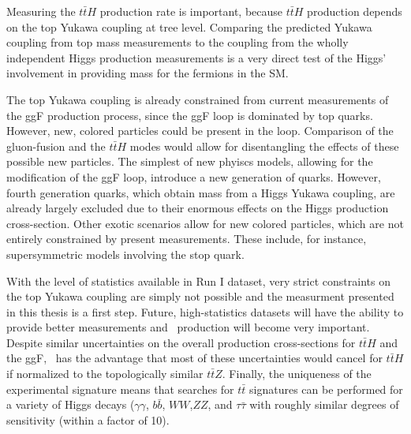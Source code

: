 Measuring the $t\bar{t}H$ production rate is important, because
$t\bar{t}H$ production depends on the top Yukawa coupling at tree level. Comparing
the predicted Yukawa coupling from top mass measurements to the coupling from
the wholly independent Higgs production measurements is a very direct 
test of the Higgs' involvement in providing mass for the fermions in the SM.

The top Yukawa coupling is already constrained from current measurements of the ggF production
process, since the ggF loop is dominated by top quarks. However, new, colored particles could be
present in the loop. Comparison of the gluon-fusion and the $t\bar{t}H$
modes would allow for disentangling the effects of these possible new particles\cite{Dawson:2013bba}. 
The simplest of new phyiscs models, allowing for the modification
of the ggF loop, introduce a new generation of quarks. However, fourth
generation quarks, which obtain mass from a Higgs Yukawa coupling, are already
largely excluded due to their enormous effects on the Higgs production
cross-section\cite{Eberhardt:2012gv}. Other exotic scenarios allow for new colored particles, 
which are not entirely constrained by present measurements\cite{Carena:2013iba,ArkaniHamed:2012kq,Carmi:2012yp}.
These include, for instance, supersymmetric models involving the stop quark.  

With the level of statistics available in Run I dataset, very strict constraints on the top 
Yukawa coupling are simply not possible and the measurment presented in this 
thesis is a first step. Future, high-statistics datasets will have the ability to provide 
better measurements and \tth\ production will become very important.
Despite similar uncertainties on the overall production cross-sections for $t\bar{t}H$ and the ggF,
\tth\ has the advantage that most of these uncertainties would cancel for $t\bar{t}H$ if normalized to the topologically similar $t\bar{t}Z$.  Finally, the uniqueness of the experimental signature means that
searches for $t\bar{t}$ signatures can be performed for a variety of Higgs decays ($\gamma\gamma$, $b\bar{b}$,
$WW$,$ZZ$, and $\tau\bar{\tau}$ with roughly similar degrees of sensitivity (within a factor of 10)\cite{Dawson:2013bba}. 


